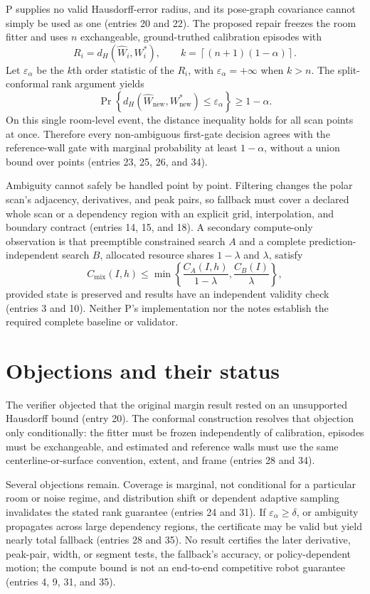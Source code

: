 \documentclass{article}
\begin{document}
P supplies no valid Hausdorff-error radius, and its pose-graph covariance cannot simply be used as one (entries 20 and 22). The proposed repair freezes the room fitter and uses $n$ exchangeable, ground-truthed calibration episodes with
\[
  R_i=d_H(\widehat W_i,W_i^*), \qquad
  k=\left\lceil(n+1)(1-\alpha)\right\rceil.
\]
Let $\varepsilon_\alpha$ be the $k$th order statistic of the $R_i$, with $\varepsilon_\alpha=+\infty$ when $k>n$. The split-conformal rank argument yields
\[
  \Pr\!\left\{d_H(\widehat W_{\mathrm{new}},W^*_{\mathrm{new}})
  \leq\varepsilon_\alpha\right\}\!\geq 1-\alpha.
\]
On this single room-level event, the distance inequality holds for all scan points at once. Therefore every non-ambiguous first-gate decision agrees with the reference-wall gate with marginal probability at least $1-\alpha$, without a union bound over points (entries 23, 25, 26, and 34).

Ambiguity cannot safely be handled point by point. Filtering changes the polar scan's adjacency, derivatives, and peak pairs, so fallback must cover a declared whole scan or a dependency region with an explicit grid, interpolation, and boundary contract (entries 14, 15, and 18). A secondary compute-only observation is that preemptible constrained search $A$ and a complete prediction-independent search $B$, allocated resource shares $1-\lambda$ and $\lambda$, satisfy
\[
  C_{\mathrm{mix}}(I,h)\leq
  \min\left\{\frac{C_A(I,h)}{1-\lambda},
  \frac{C_B(I)}{\lambda}\right\},
\]
provided state is preserved and results have an independent validity check (entries 3 and 10). Neither P's implementation nor the notes establish the required complete baseline or validator.

\section*{Objections and their status}
The verifier objected that the original margin result rested on an unsupported Hausdorff bound (entry 20). The conformal construction resolves that objection only conditionally: the fitter must be frozen independently of calibration, episodes must be exchangeable, and estimated and reference walls must use the same centerline-or-surface convention, extent, and frame (entries 28 and 34).

Several objections remain. Coverage is marginal, not conditional for a particular room or noise regime, and distribution shift or dependent adaptive sampling invalidates the stated rank guarantee (entries 24 and 31). If $\varepsilon_\alpha\geq\delta$, or ambiguity propagates across large dependency regions, the certificate may be valid but yield nearly total fallback (entries 28 and 35). No result certifies the later derivative, peak-pair, width, or segment tests, the fallback's accuracy, or policy-dependent motion; the compute bound is not an end-to-end competitive robot guarantee (entries 4, 9, 31, and 35).
\end{document}
